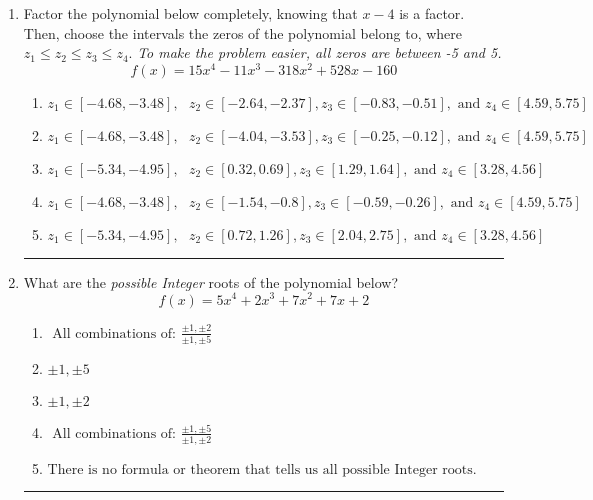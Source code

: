 \documentclass[14pt]{extbook}
\newcommand{\litem}[1]{\item#1\hspace*{-1cm}\rule{\textwidth}{0.4pt}}
\begin{document}
\begin{enumerate}
{\begin{enumerate}[label=\Alph*.]
\end{enumerate} }
\litem{
Factor the polynomial below completely, knowing that $x-4$ is a factor. Then, choose the intervals the zeros of the polynomial belong to, where $z_1 \leq z_2 \leq z_3 \leq z_4$. \textit{To make the problem easier, all zeros are between -5 and 5.}\[ f(x) = 15x^{4} -11 x^{3} -318 x^{2} +528 x -160 \]\begin{enumerate}[label=\Alph*.]
\item \( z_1 \in [-4.68, -3.48], \text{   }  z_2 \in [-2.64, -2.37], z_3 \in [-0.83, -0.51], \text{   and   } z_4 \in [4.59, 5.75] \)
\item \( z_1 \in [-4.68, -3.48], \text{   }  z_2 \in [-4.04, -3.53], z_3 \in [-0.25, -0.12], \text{   and   } z_4 \in [4.59, 5.75] \)
\item \( z_1 \in [-5.34, -4.95], \text{   }  z_2 \in [0.32, 0.69], z_3 \in [1.29, 1.64], \text{   and   } z_4 \in [3.28, 4.56] \)
\item \( z_1 \in [-4.68, -3.48], \text{   }  z_2 \in [-1.54, -0.8], z_3 \in [-0.59, -0.26], \text{   and   } z_4 \in [4.59, 5.75] \)
\item \( z_1 \in [-5.34, -4.95], \text{   }  z_2 \in [0.72, 1.26], z_3 \in [2.04, 2.75], \text{   and   } z_4 \in [3.28, 4.56] \)

\end{enumerate} }
\litem{
What are the \textit{possible Integer} roots of the polynomial below?\[ f(x) = 5x^{4} +2 x^{3} +7 x^{2} +7 x + 2 \]\begin{enumerate}[label=\Alph*.]
\item \( \text{ All combinations of: }\frac{\pm 1,\pm 2}{\pm 1,\pm 5} \)
\item \( \pm 1,\pm 5 \)
\item \( \pm 1,\pm 2 \)
\item \( \text{ All combinations of: }\frac{\pm 1,\pm 5}{\pm 1,\pm 2} \)
\item \( \text{There is no formula or theorem that tells us all possible Integer roots.} \)

\end{enumerate} }
\end{enumerate}
\end{document}
